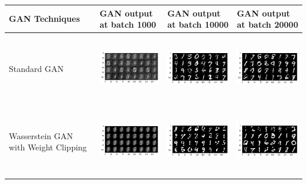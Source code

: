 \begin{table}[!htpb]
	\centering
	\begin{tabular}[t]{|>{\centering}p{2cm}|p{4.6cm}|p{4.6cm}|p{4.6cm}|}

		\cellcolor{blue!25}GAN Techniques & \cellcolor{blue!25} GAN output at batch 1000 & \cellcolor{blue!25} GAN output at batch 10000   & \cellcolor{blue!25} GAN output at batch 20000 \\ \hline
		Standard GAN & \includegraphics[height=3cm, width=4.4cm]{Exercise4/Report/GAN_999} &  \includegraphics[height=3cm, width=4.4cm]{Exercise4/Report/GAN_9999} & \includegraphics[height=3cm, width=4.4cm]{Exercise4/Report/GAN_20000}\\ \hline
		
		Wasserstein GAN with Weight Clipping & \includegraphics[height=3cm, width=4.4cm]{Exercise4/Report/WGAN_WC_999} &  \includegraphics[height=3cm, width=4.4cm]{Exercise4/Report/WGAN_WC_9999} & \includegraphics[height=3cm, width=4.4cm]{Exercise4/Report/WGAN_WC_20000}\\ \hline
			

\end{tabular}
\end{table}
